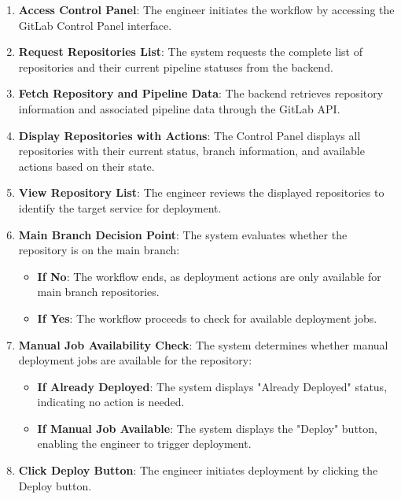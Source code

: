 \begin{enumerate}
    \item \textbf{Access Control Panel}: The engineer initiates the workflow by accessing the GitLab Control Panel interface.
    
    \item \textbf{Request Repositories List}: The system requests the complete list of repositories and their current pipeline statuses from the backend.
    
    \item \textbf{Fetch Repository and Pipeline Data}: The backend retrieves repository information and associated pipeline data through the GitLab API.
    
    \item \textbf{Display Repositories with Actions}: The Control Panel displays all repositories with their current status, branch information, and available actions based on their state.
    
    \item \textbf{View Repository List}: The engineer reviews the displayed repositories to identify the target service for deployment.
    
    \item \textbf{Main Branch Decision Point}: The system evaluates whether the repository is on the main branch:
    \begin{itemize}
        \item \textbf{If No}: The workflow ends, as deployment actions are only available for main branch repositories.
        \item \textbf{If Yes}: The workflow proceeds to check for available deployment jobs.
    \end{itemize}
    
    \item \textbf{Manual Job Availability Check}: The system determines whether manual deployment jobs are available for the repository:
    \begin{itemize}
        \item \textbf{If Already Deployed}: The system displays "Already Deployed" status, indicating no action is needed.
        \item \textbf{If Manual Job Available}: The system displays the "Deploy" button, enabling the engineer to trigger deployment.
    \end{itemize}
    
    \item \textbf{Click Deploy Button}: The engineer initiates deployment by clicking the Deploy button.
    

\end{enumerate}
